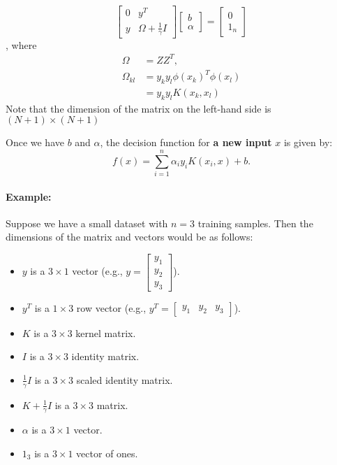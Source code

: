 \[
\begin{bmatrix}
0 & y^T \\
y & \Omega + \frac{1}{\gamma} I
\end{bmatrix}
\begin{bmatrix}
b \\
\alpha
\end{bmatrix}
=
\begin{bmatrix}
0 \\
1_n
\end{bmatrix}
\], 
where 
\begin{align*}
	\Omega &= ZZ^T,\\  
	\Omega_{kl}&= y_ky_l\phi(x_k)^T\phi(x_l)\\ 
			   &= y_ky_lK(x_k, x_l)
\end{align*}
Note that the dimension of the matrix on the left-hand side is $(N+1)\times (N+1)$

Once we have \( b \) and \( \alpha \), the decision function for \textbf{a new input} \( x \) is given by:
\[
f(x) = \sum_{i=1}^n \alpha_i y_i K(x_i, x) + b.
\]

\paragraph{Example: }Suppose we have a small dataset with \( n = 3 \) training samples. Then the dimensions of the matrix and vectors would be as follows:

\begin{itemize}
	\item \( y \) is a \( 3 \times 1 \) vector (e.g., \( y = \begin{bmatrix} y_1 \\ y_2 \\ y_3 \end{bmatrix} \)).
	\item \( y^T \) is a \( 1 \times 3 \) row vector (e.g., \( y^T = \begin{bmatrix} y_1 & y_2 & y_3 \end{bmatrix} \)).
	\item \( K \) is a \( 3 \times 3 \) kernel matrix.
	\item \( I \) is a \( 3 \times 3 \) identity matrix.
	\item \( \frac{1}{\gamma} I \) is a \( 3 \times 3 \) scaled identity matrix.
	\item \( K + \frac{1}{\gamma} I \) is a \( 3 \times 3 \) matrix.
	\item \( \alpha \) is a \( 3 \times 1 \) vector.
	\item \( 1_3 \) is a \( 3 \times 1 \) vector of ones.
\end{itemize}


